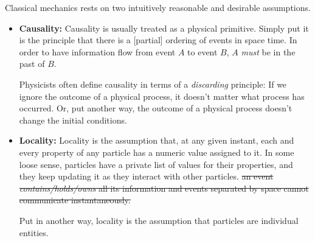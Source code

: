 \documentclass[11pt, oneside]{article}   	%
\newcommand{\pablo}[1]{{\color{red}#1}}
\begin{document}
Classical mechanics rests on two intuitively reasonable and desirable assumptions.
\begin{itemize}
\item \textbf{Causality:} Causality is usually treated as a physical primitive. Simply put it is the principle that there is a [partial] ordering of events in space time. \pablo{In order to have information flow from event \(A\) to event \(B\), \(A\) \textit{must} be in the past of \(B\).}

Physicists often define causality in terms of a \emph{discarding} principle: If we ignore the outcome of a physical process, it doesn't matter what process has occurred. Or, put another way, the outcome of a physical process doesn't change the initial conditions. 

\item \textbf{Locality:} \pablo{Locality is the assumption that, at any given instant, each and every property of any particle has a numeric value assigned to it. In some loose sense, particles have a private list of values for their properties, and they keep updating it as they interact with other particles.} \sout{an event \emph{contains/holds/owns} all its information and events separated by space cannot communicate instantaneously.}

\pablo{Put in another way, locality is the assumption that particles are individual entities.}
\end{itemize}
\end{document}
